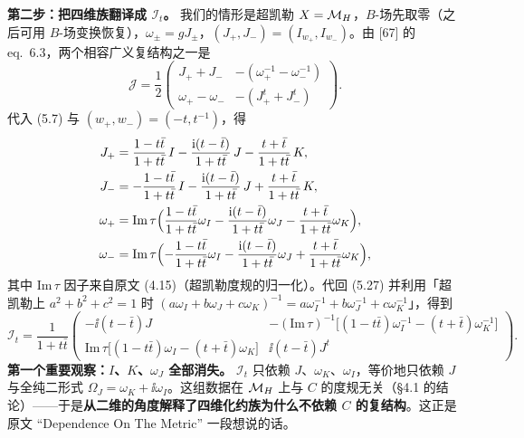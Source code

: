\textbf{第二步：把四维族翻译成 $\mathcal I_t$。} 我们的情形是超凯勒 $X=\mathcal{M}_H$，$B$-场先取零（之后可用 $B$-场变换恢复），$\omega_\pm=gJ_\pm$，$(J_+,J_-)=(I_{w_+},I_{w_-})$。由 [67] 的 eq.\ 6.3，两个相容广义复结构之一是\pA{}
\begin{equation}
\mathcal J=\frac12\begin{pmatrix}J_++J_-&-(\omega_+^{-1}-\omega_-^{-1})\\ \omega_+-\omega_-&-(J_+^{t}+J_-^{t})\end{pmatrix}.
\label{eq:Jgc}
\end{equation}
代入 (5.7) 与 $(w_+,w_-)=(-t,t^{-1})$，得\pA{}
\begin{equation}
\begin{aligned}
J_+&=\frac{1-t\bar t}{1+t\bar t}\,I-\frac{\mathrm{i}(t-\bar t)}{1+t\bar t}\,J-\frac{t+\bar t}{1+t\bar t}\,K,\\
J_-&=-\frac{1-t\bar t}{1+t\bar t}\,I-\frac{\mathrm{i}(t-\bar t)}{1+t\bar t}\,J+\frac{t+\bar t}{1+t\bar t}\,K,\\
\omega_+&=\mathrm{Im}\,\tau\Bigl(\frac{1-t\bar t}{1+t\bar t}\omega_I-\frac{\mathrm{i}(t-\bar t)}{1+t\bar t}\omega_J-\frac{t+\bar t}{1+t\bar t}\omega_K\Bigr),\\
\omega_-&=\mathrm{Im}\,\tau\Bigl(-\frac{1-t\bar t}{1+t\bar t}\omega_I-\frac{\mathrm{i}(t-\bar t)}{1+t\bar t}\omega_J+\frac{t+\bar t}{1+t\bar t}\omega_K\Bigr),
\end{aligned}
\label{eq:Jpm}
\end{equation}
其中 $\mathrm{Im}\,\tau$ 因子来自原文 (4.15)（超凯勒度规的归一化）。代回 (5.27) 并利用「超凯勒上 $a^2+b^2+c^2=1$ 时 $(a\omega_I+b\omega_J+c\omega_K)^{-1}=a\omega_I^{-1}+b\omega_J^{-1}+c\omega_K^{-1}$」，得到\pA{}
\begin{equation}
\mathcal I_t=\frac{1}{1+t\bar t}
\begin{pmatrix}
-\ii(t-\bar t)J & -(\mathrm{Im}\,\tau)^{-1}\bigl[(1-t\bar t)\omega_I^{-1}-(t+\bar t)\omega_K^{-1}\bigr]\\[4pt]
\mathrm{Im}\,\tau\bigl[(1-t\bar t)\omega_I-(t+\bar t)\omega_K\bigr] & \ii(t-\bar t)J^{t}
\end{pmatrix}.
\label{eq:It}
\end{equation}
\textbf{第一个重要观察：$I$、$K$、$\omega_J$ 全部消失。} $\mathcal I_t$ 只依赖 $J$、$\omega_K$、$\omega_I$，等价地只依赖 $J$ 与全纯二形式 $\Omega_J=\omega_K+\ii\omega_I$。这组数据在 $\mathcal{M}_H$ 上与 $C$ 的度规无关（§4.1 的结论）——于是\textbf{从二维的角度解释了四维化约族为什么不依赖 $C$ 的复结构}\pA{}。这正是原文 ``Dependence On The Metric'' 一段想说的话。

